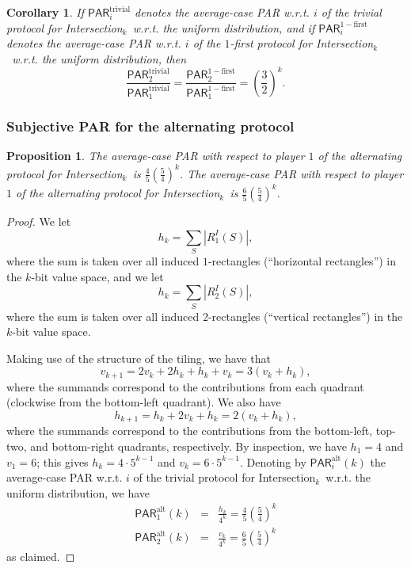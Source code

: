 \documentclass{article}
\theoremstyle{theorem}
\newtheorem{cor}[theorem]{Corollary}
\newtheorem{prop}[theorem]{Proposition}
\theoremstyle{definition}
\theoremstyle{remark}
\newcommand{\PAR}{\ensuremath{\mathsf{PAR}}}
\newcommand{\intersection}{{\sc In\-ter\-sec\-tion}\ensuremath{_k}}
\begin{document}
\begin{cor}
If $\PAR^\mathrm{trivial}_i$ denotes the average-case PAR w.r.t. $i$ of the trivial protocol for \intersection\ w.r.t. the uniform distribution, and if $\PAR^\mathrm{1-first}_i$ denotes the average-case PAR w.r.t. $i$ of the $1$-first protocol for \intersection\ w.r.t. the uniform distribution, then
\[
\frac{\PAR^\mathrm{trivial}_2}{\PAR^\mathrm{trivial}_1} = \frac{\PAR^\mathrm{1-first}_2}{\PAR^\mathrm{1-first}_1} = \left(\frac{3}{2}\right)^k.
\]
\end{cor}



\subsubsection{Subjective PAR for the alternating protocol}


\begin{prop}
The average-case PAR with respect to player $1$ of the alternating protocol for \intersection\ is $\frac{4}{5}\left(\frac{5}{4}\right)^k$.  The average-case PAR with respect to player $1$ of the alternating protocol for \intersection\ is $\frac{6}{5}\left(\frac{5}{4}\right)^k$.
\end{prop}
\begin{proof}
We let
\[
h_k = \sum_S |R_1^I(S)|,
\]
where the sum is taken over all induced $1$-rectangles (``horizontal rectangles'') in the $k$-bit value space, and we let
\[
h_k = \sum_S |R_2^I(S)|,
\]
where the sum is taken over all induced $2$-rectangles (``vertical rectangles'') in the $k$-bit value space.

Making use of the structure of the tiling, we have that
\[
v_{k+1} = 2v_k + 2h_k + h_k + v_k = 3(v_k+h_k),
\]
where the summands correspond to the contributions from each quadrant (clockwise from the bottom-left quadrant).  We also have
\[
h_{k+1} = h_k + 2v_k + h_k = 2(v_k+h_k),
\]
where the summands correspond to the contributions from the bottom-left, top-two, and bottom-right quadrants, respectively.  By inspection, we have $h_1 = 4$ and $v_1 = 6$; this gives $h_k = 4\cdot 5^{k-1}$ and $v_k = 6\cdot 5^{k-1}$.  Denoting by $\PAR^\mathrm{alt}_i(k)$ the average-case PAR w.r.t. $i$ of the trivial protocol for \intersection\ w.r.t. the uniform distribution, we have
\begin{eqnarray*}
\PAR^\mathrm{alt}_1(k) &=& \frac{h_k}{4^k} = \frac{4}{5}\left(\frac{5}{4}\right)^k\\
\PAR^\mathrm{alt}_2(k) &=& \frac{v_k}{4^k} = \frac{6}{5}\left(\frac{5}{4}\right)^k
\end{eqnarray*}
as claimed.
\end{proof}
\end{document}
